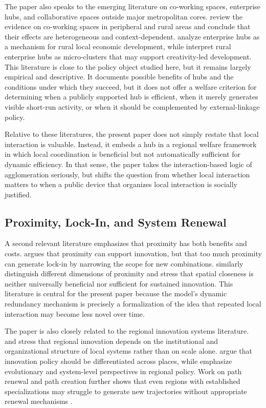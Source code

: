 The paper also speaks to the emerging literature on co-working spaces, enterprise hubs, and collaborative spaces outside major metropolitan cores. \citet{VoglAkhavan2022} review the evidence on co-working spaces in peripheral and rural areas and conclude that their effects are heterogeneous and context-dependent. \citet{MerrellPhillipsonGortonCowie2022} analyze enterprise hubs as a mechanism for rural local economic development, while \citet{MerrellRoweCowieGkartzios2021} interpret rural enterprise hubs as micro-clusters that may support creativity-led development. This literature is close to the policy object studied here, but it remains largely empirical and descriptive. It documents possible benefits of hubs and the conditions under which they succeed, but it does not offer a welfare criterion for determining when a publicly supported hub is efficient, when it merely generates visible short-run activity, or when it should be complemented by external-linkage policy.

Relative to these literatures, the present paper does not simply restate that local interaction is valuable. Instead, it embeds a hub in a regional welfare framework in which local coordination is beneficial but not automatically sufficient for dynamic efficiency. In that sense, the paper takes the interaction-based logic of agglomeration seriously, but shifts the question from whether local interaction matters to when a public device that organizes local interaction is socially justified.

\subsection{Proximity, Lock-In, and System Renewal}

A second relevant literature emphasizes that proximity has both benefits and costs. \citet{Boschma2005} argues that proximity can support innovation, but that too much proximity can generate lock-in by narrowing the scope for new combinations. \citet{TorreRallet2005} similarly distinguish different dimensions of proximity and stress that spatial closeness is neither universally beneficial nor sufficient for sustained innovation. This literature is central for the present paper because the model's dynamic redundancy mechanism is precisely a formalization of the idea that repeated local interaction may become less novel over time.

The paper is also closely related to the regional innovation systems literature. \citet{CookeUrangaEtxebarria1997} and \citet{AsheimLawtonSmithOughton2011} stress that regional innovation depends on the institutional and organizational structure of local systems rather than on scale alone. \citet{TodtlingTrippl2005} argue that innovation policy should be differentiated across places, while \citet{CoenenAsheimBuggeHerstad2017} emphasize evolutionary and system-level perspectives in regional policy. Work on path renewal and path creation further shows that even regions with established specializations may struggle to generate new trajectories without appropriate renewal mechanisms \citep{ChaminadeBellandiPlecheroSantini2019}.

